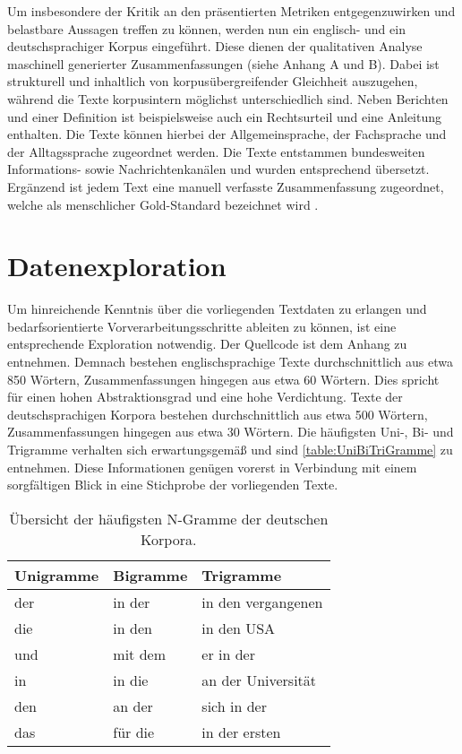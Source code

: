 \noindent
Um insbesondere der Kritik an den präsentierten Metriken entgegenzuwirken und belastbare Aussagen treffen zu können, werden nun ein englisch- und ein deutschsprachiger Korpus eingeführt. Diese dienen der qualitativen Analyse maschinell generierter Zusammenfassungen (siehe Anhang A und B). Dabei ist strukturell und inhaltlich von korpusübergreifender Gleichheit auszugehen, während die Texte korpusintern möglichst unterschiedlich sind. Neben Berichten und einer Definition ist beispielsweise auch ein Rechtsurteil und eine Anleitung enthalten. Die Texte können hierbei der Allgemeinsprache, der Fachsprache und der Alltagssprache zugeordnet werden. Die Texte entstammen bundesweiten Informations- sowie Nachrichtenkanälen und wurden entsprechend übersetzt. Ergänzend ist jedem Text eine manuell verfasste Zusammenfassung zugeordnet, welche als menschlicher Gold-Standard bezeichnet wird \cite{WIS14}.


\section{Datenexploration}
\noindent
Um hinreichende Kenntnis über die vorliegenden Textdaten zu erlangen und bedarfsorientierte Vorverarbeitungsschritte ableiten zu können, ist eine entsprechende Exploration notwendig. Der Quellcode ist dem Anhang zu entnehmen. Demnach bestehen englischsprachige Texte durchschnittlich aus etwa 850 Wörtern, Zusammenfassungen hingegen aus etwa 60 Wörtern. Dies spricht für einen hohen Abstraktionsgrad und eine hohe Verdichtung. Texte der deutschsprachigen Korpora bestehen durchschnittlich aus etwa 500 Wörtern, Zusammenfassungen hingegen aus etwa 30 Wörtern. Die häufigsten Uni-, Bi- und Trigramme verhalten sich erwartungsgemäß und sind \autoref{table:UniBiTriGramme} zu entnehmen. Diese Informationen genügen vorerst in Verbindung mit einem sorgfältigen Blick in eine Stichprobe der vorliegenden Texte.\\

\begin{table}[htb]
\centering
\begin{tabular}{ | p{3.75cm} | p{3.75cm} | p{3.75cm} | }
\hline
\textbf{Unigramme} & \textbf{Bigramme} & \textbf{Trigramme} \\
\hline
der & in der & in den vergangenen \\
\hline
die & in den & in den USA \\
\hline
und & mit dem & er in der \\
\hline
in & in die & an der Universität \\
\hline
den & an der & sich in der \\
\hline
das & für die & in der ersten \\
\hline
\end{tabular}
\caption{Übersicht der häufigsten N-Gramme der deutschen Korpora.}
\label{table:UniBiTriGramme}
\end{table}
\newpage


